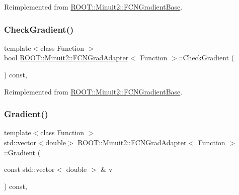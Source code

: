 Reimplemented from \mbox{\hyperlink{classROOT_1_1Minuit2_1_1FCNGradientBase_ae69375c7506f0be6a1ab4e4e937ac555}{R\+O\+O\+T\+::\+Minuit2\+::\+F\+C\+N\+Gradient\+Base}}.

\mbox{\label{classROOT_1_1Minuit2_1_1FCNGradAdapter_a10faf0c868284a440f291465b7efd08e}} 
\subsubsection{\texorpdfstring{CheckGradient()}{CheckGradient()}\hspace{0.1cm}{\footnotesize\ttfamily [2/2]}}
{\footnotesize\ttfamily template$<$class Function $>$ \\
bool \mbox{\hyperlink{classROOT_1_1Minuit2_1_1FCNGradAdapter}{R\+O\+O\+T\+::\+Minuit2\+::\+F\+C\+N\+Grad\+Adapter}}$<$ Function $>$\+::Check\+Gradient (\begin{DoxyParamCaption}{ }\end{DoxyParamCaption}) const\hspace{0.3cm}{\ttfamily [inline]}, {\ttfamily [virtual]}}



Reimplemented from \mbox{\hyperlink{classROOT_1_1Minuit2_1_1FCNGradientBase_ae69375c7506f0be6a1ab4e4e937ac555}{R\+O\+O\+T\+::\+Minuit2\+::\+F\+C\+N\+Gradient\+Base}}.

\mbox{\label{classROOT_1_1Minuit2_1_1FCNGradAdapter_ae91d0453fd5e953f75551576659d6c7b}} 
\subsubsection{\texorpdfstring{Gradient()}{Gradient()}\hspace{0.1cm}{\footnotesize\ttfamily [1/2]}}
{\footnotesize\ttfamily template$<$class Function $>$ \\
std\+::vector$<$double$>$ \mbox{\hyperlink{classROOT_1_1Minuit2_1_1FCNGradAdapter}{R\+O\+O\+T\+::\+Minuit2\+::\+F\+C\+N\+Grad\+Adapter}}$<$ Function $>$\+::Gradient (\begin{DoxyParamCaption}\item[{const std\+::vector$<$ double $>$ \&}]{v }\end{DoxyParamCaption}) const\hspace{0.3cm}{\ttfamily [inline]}, {\ttfamily [virtual]}}



